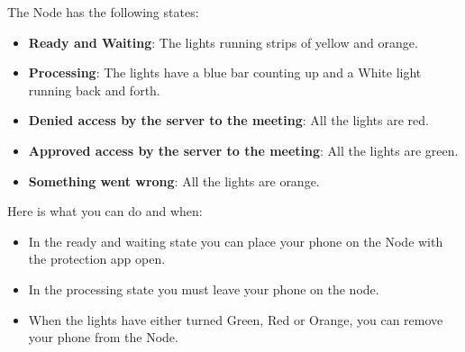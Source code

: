 \documentclass[a4paper,12pt,titlepage]{article}
\begin{document}
    The Node has the following states:
    \begin{itemize}
       \item {\textbf{Ready and Waiting}: The lights running strips of yellow and orange.}
       \item {\textbf{Processing}: The lights have a blue bar counting up and a White light running back and forth.}
       \item {\textbf{Denied access by the server to the meeting}: All the lights are red.}
       \item {\textbf{Approved access by the server to the meeting}: All the lights are green.}
       \item {\textbf{Something went wrong}: All the lights are orange.}
       \end{itemize}
      Here is what you can do and when:
        \begin{itemize}
        \item In the ready and waiting state you can place your phone on the Node with the protection app open.
        \item In the processing state you must leave your phone on the node.
        \item When the lights have either turned Green, Red or Orange, you can remove your phone from the Node.
    \end{itemize}
\end{document}
